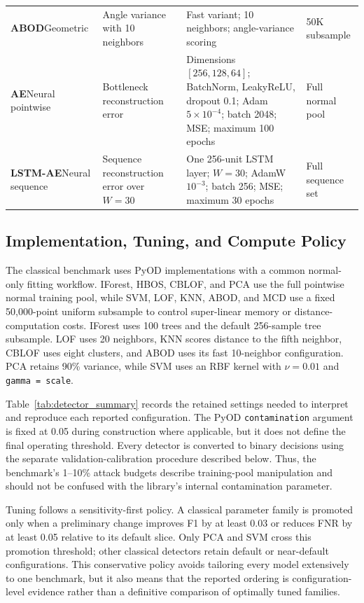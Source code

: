 \documentclass[10pt,conference]{IEEEtran}
\begin{document}
\begin{table}[t]
\begin{tabular}{|p{2.1cm}|p{3.25cm}|p{7.6cm}|p{2.0cm}|}
\textbf{ABOD}\newline Geometric & Angle variance with 10 neighbors & Fast variant; 10 neighbors; angle-variance scoring & 50K subsample \\
\textbf{AE}\newline Neural pointwise & Bottleneck reconstruction error & Dimensions $[256,128,64]$; BatchNorm, LeakyReLU, dropout 0.1; Adam $5\times10^{-4}$; batch 2048; MSE; maximum 100 epochs & Full normal pool \\
\textbf{LSTM-AE}\newline Neural sequence & Sequence reconstruction error over $W=30$ & One 256-unit LSTM layer; $W=30$; AdamW $10^{-3}$; batch 256; MSE; maximum 30 epochs & Full sequence set \\
\hline
\end{tabular}
\end{table}

\subsection{Implementation, Tuning, and Compute Policy}

The classical benchmark uses PyOD implementations with a common normal-only fitting workflow. IForest, HBOS, CBLOF, and PCA use the full pointwise normal training pool, while SVM, LOF, KNN, ABOD, and MCD use a fixed 50,000-point uniform subsample to control super-linear memory or distance-computation costs. IForest uses 100 trees and the default 256-sample tree subsample. LOF uses 20 neighbors, KNN scores distance to the fifth neighbor, CBLOF uses eight clusters, and ABOD uses its fast 10-neighbor configuration. PCA retains 90\% variance, while SVM uses an RBF kernel with $\nu=0.01$ and \texttt{gamma = scale}.

Table~\ref{tab:detector_summary} records the retained settings needed to interpret and reproduce each reported configuration. The PyOD \texttt{contamination} argument is fixed at 0.05 during construction where applicable, but it does not define the final operating threshold. Every detector is converted to binary decisions using the separate validation-calibration procedure described below. Thus, the benchmark's 1--10\% attack budgets describe training-pool manipulation and should not be confused with the library's internal contamination parameter.

Tuning follows a sensitivity-first policy. A classical parameter family is promoted only when a preliminary change improves F1 by at least 0.03 or reduces FNR by at least 0.05 relative to its default slice. Only PCA and SVM cross this promotion threshold; other classical detectors retain default or near-default configurations. This conservative policy avoids tailoring every model extensively to one benchmark, but it also means that the reported ordering is configuration-level evidence rather than a definitive comparison of optimally tuned families.
\end{document}
